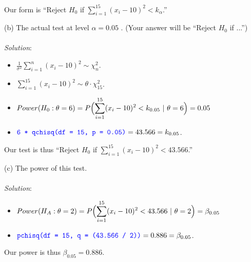 \documentclass[12pt]{article}
\newcommand{\XBB}{\color{blue}}
\newcommand{\ds}{\displaystyle}
\begin{document}
\noindent
Our form is ``Reject $ H_{0} $ if $ \ds \sum_{i=1}^{15} (x_{i}-10)^{2} < k_{\alpha} $.''

\vspace{2.5mm}

\newpage

(b) The actual test at level $ \alpha = 0.05$ . (Your answer will be ``Reject $ H_{0} $ if ...'') \\
\vspace{2.5mm} \\
\textit{Solution}:
\vspace{2.5mm} \\

\begin{itemize}
    \item $ \ds \frac{1}{\sigma^{2}} \sum_{i=1}^{n} (x_{i}-10)^{2} \sim \chi_{n}^{2} $.
    \item $ \ds \sum_{i=1}^{15} (x_{i}-10)^{2} \sim \theta \cdot \chi_{15}^{2} $.
    \item $ \ds Power(H_{0} : \theta = 6) = P \Bigl(\sum_{i=1}^{15} (x_{i}-10)^{2} < k_{0.05} \ | \ \theta = 6 \Bigr) = 0.05 $
    \item $ \ds {\XBB \texttt{6 * qchisq(df = 15, p = 0.05)}} = 43.566 = k_{0.05} $.
\end{itemize}

\noindent
Our test is thus ``Reject $ H_{0} $ if $ \ds \sum_{i=1}^{15} (x_{i}-10)^{2} < 43.566 $.'' \\

\vspace{2.5mm}

(c) The power of this test. \\
\vspace{2.5mm} \\
\textit{Solution}:
\vspace{2.5mm} \\

\begin{itemize}
    \item $ \ds Power(H_{A} : \theta = 2) = P \Bigl(\sum_{i=1}^{15} (x_{i}-10)^{2} < 43.566 \ | \ \theta = 2 \Bigr) = \beta_{0.05} $
    \item $ \ds {\XBB \texttt{pchisq(df = 15, q = (43.566 / 2))}} = 0.886 = \beta_{0.05} $.
\end{itemize}

\noindent
Our power is thus $ \beta_{0.05} = 0.886 $. \\

\vspace{2.5mm}
\end{document}
